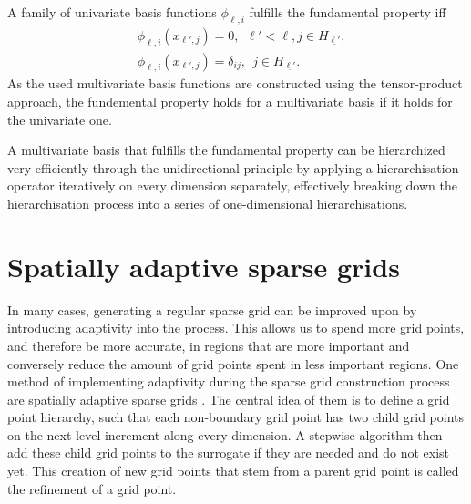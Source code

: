 \documentclass[
  a4paper,  %
  twoside,  %
  bibliography=totoc,
  headsepline,
  cleardoublepage=empty,
  parskip=half,
  draft=false
]{scrbook}
\begin{document}
\begin{definition}
A family of univariate basis functions $\phi_{\ell,i}$ fulfills the fundamental property iff
\begin{equation}
\begin{split}
&\phi_{\ell,i}(x_{\ell', j}) = 0, ~~  \ell' < \ell, j \in H_{\underline{\ell'}},\\
&\phi_{\ell,i}(x_{\ell', j}) = \delta_{ij}, ~~  j \in H_{\underline{\ell'}}.
\end{split}
\nonumber
\end{equation}
As the used multivariate basis functions are constructed using the tensor-product approach, the fundemental property holds for a multivariate basis if it holds for the univariate one.
\end{definition}
%
A multivariate basis that fulfills the fundamental property can be hierarchized very efficiently through the unidirectional principle \cite{Balder1994} by applying a hierarchisation operator iteratively on every dimension separately, effectively breaking down the hierarchisation process into a series of one-dimensional hierarchisations.

\section{Spatially adaptive sparse grids}

In many cases, generating a regular sparse grid can be improved upon by introducing adaptivity into the process.
This allows us to spend more grid points, and therefore be more accurate, in regions that are more important and conversely reduce the amount of grid points spent in less important regions.
One method of implementing adaptivity during the sparse grid construction process are spatially adaptive sparse grids \cite{Pflueger2012}.
The central idea of them is to define a grid point hierarchy, such that each non-boundary grid point has two child grid points on the next level increment along every dimension.
A stepwise algorithm then add these child grid points to the surrogate if they are needed and do not exist yet.
This creation of new grid points that stem from a parent grid point is called the refinement of a grid point.
\end{document}
